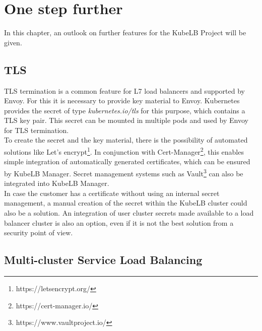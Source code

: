 \chapter{One step further}

In this chapter, an outlook on further features for the KubeLB Project will be given.

\section{TLS}

TLS termination is a common feature for L7 load balancers and supported by Envoy.
For this it is necessary to provide key material to Envoy.
Kubernetes provides the secret of type \textit{kubernetes.io/tls} for this purpose, which contains a TLS key pair.
This secret can be mounted in multiple pods and used by Envoy for TLS termination.
\\
To create the secret and the key material, there is the possibility of automated solutions like Let's encrypt\footnote{https://letsencrypt.org/}.
In conjunction with Cert-Manager\footnote{https://cert-manager.io/}, this enables simple integration of automatically generated certificates, which can be ensured by KubeLB Manager.
Secret management systems such as Vault\footnote{https://www.vaultproject.io/} can also be integrated into KubeLB Manager.
\\
In case the customer has a certificate without using an internal secret management, a manual creation of the secret within the KubeLB cluster could also be a solution.
An integration of user cluster secrets made available to a load balancer cluster is also an option, even if it is not the best solution from a security point of view.

\section{Multi-cluster Service Load Balancing}

